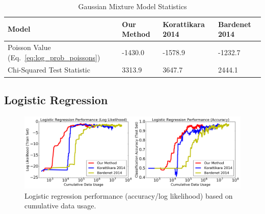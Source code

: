 \documentclass{article}
\begin{document}


\begin{table}[t]
    \caption{Gaussian Mixture Model Statistics}
    \label{tab:poissons}
    \centering
    \begin{tabular}{l l l l}
    \toprule
    Model & Our Method & Korattikara 2014 & Bardenet 2014 \\
    \midrule
    Poisson Value (Eq.~\ref{eq:log_prob_poissons}) & -1430.0 & -1578.9 & -1232.7 \\
    Chi-Squared Test Statistic & 3313.9 & 3647.7 & 2444.1 \\
    \bottomrule
    \end{tabular}
\end{table}




\subsection{Logistic Regression}\label{ssec:logistic}

\begin{figure}[t]
	\centering
	\includegraphics[width=1\linewidth]{logistic_performance.png}
	\caption{
    Logistic regression performance (accuracy/log likelihood) based on
    cumulative data usage.
    }
	\label{fig:logistic_performance}
\end{figure}
\end{document}
